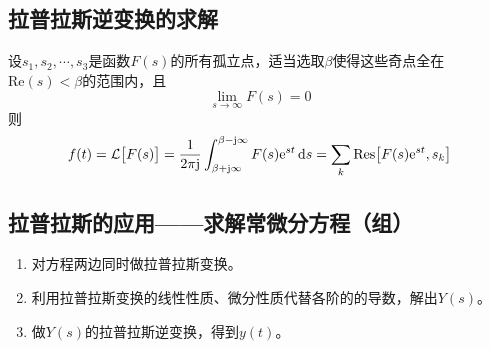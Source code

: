\subsection{拉普拉斯逆变换的求解}

设$s_1,s_2,\cdots,s_3$是函数$F(s)$的所有孤立点，适当选取$\beta$使得这些奇点全在$\text{Re}(s)<\beta $的范围内，且
\begin{equation*}
	\lim_{s \to \infty} F(s) = 0
\end{equation*}
则
\begin{equation}
	f(t)=\mathcal{L}\big[F(s)\big]=\frac{1}{2 \pi \text{j}}\int_{\beta + \text{j} \infty}^{\beta- \text{j} \infty} F(s){\rm{e}}^{st}\,{\rm{d}} s=\sum_{k}\text{Res}\big[F(s){\rm{e}}^{st}, s_k\big]
\end{equation}
\vspace*{0.5em}

\subsection{拉普拉斯的应用——求解常微分方程（组）}
\texample[求解拉普拉斯求解常微分方程（组）]\vspace*{1em}
\noindent \vspace*{1.5em} \noindent  \hspace*{0.2em}  \hspace{1.5em}
\vspace*{-1em}
\begin{enumerate}
	\item 对方程两边同时做拉普拉斯变换。
	\item 利用拉普拉斯变换的线性性质、微分性质代替各阶的的导数，解出$Y(s)$。
	\item 做$Y(s)$的拉普拉斯逆变换，得到$y(t)$。
\end{enumerate}








